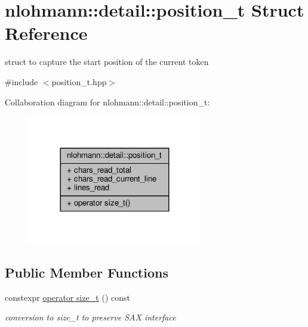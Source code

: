 \hypertarget{structnlohmann_1_1detail_1_1position__t}{}\section{nlohmann\+:\+:detail\+:\+:position\+\_\+t Struct Reference}
\label{structnlohmann_1_1detail_1_1position__t}


struct to capture the start position of the current token  




{\ttfamily \#include $<$position\+\_\+t.\+hpp$>$}



Collaboration diagram for nlohmann\+:\+:detail\+:\+:position\+\_\+t\+:
\nopagebreak
\begin{figure}[H]
\begin{center}
\leavevmode
\includegraphics[width=216pt]{structnlohmann_1_1detail_1_1position__t__coll__graph}
\end{center}
\end{figure}
\subsection*{Public Member Functions}
\begin{DoxyCompactItemize}
\item 
constexpr \hyperlink{structnlohmann_1_1detail_1_1position__t_ac9ad1e0f143f162e2e0c979cd678d683}{operator size\+\_\+t} () const
\begin{DoxyCompactList}\small\item\em conversion to size\+\_\+t to preserve S\+AX interface \end{DoxyCompactList}\end{DoxyCompactItemize}
